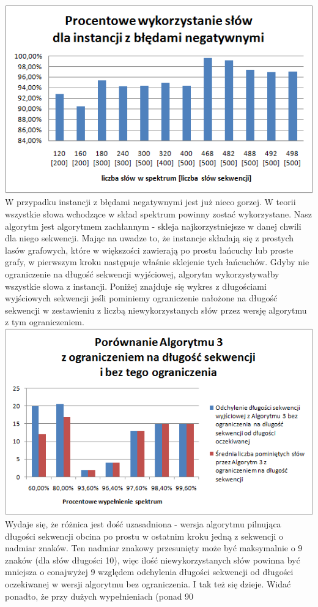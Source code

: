 \documentclass[a4paper]{article}
\begin{document}
\includegraphics{percentageUsedWords_general_negative.png}
W przypadku instancji z błędami negatywnymi jest już nieco gorzej. W teorii wszystkie słowa wchodzące w skład spektrum powinny zostać wykorzystane. Nasz algorytm jest algorytmem zachłannym - skleja najkorzystniejsze w danej chwili dla niego sekwencji. Mając na uwadze to, że instancje składają się z prostych lasów grafowych, które w większości zawierają po prostu łańcuchy lub proste grafy, w pierwszym kroku następuje właśnie sklejenie tych łańcuchów. Gdyby nie ograniczenie na długość sekwencji wyjściowej, algorytm wykorzystywałby wszystkie słowa z instancji. Poniżej znajduje się wykres z długościami wyjściowych sekwencji jeśli pominiemy ograniczenie nałożone na długość sekwencji w zestawieniu z liczbą niewykorzystanych słów przez wersję algorytmu z tym ograniczeniem.
\includegraphics{withoutNConstraint_general_negative.png}
Wydaje się, że różnica jest dość uzasadniona - wersja algorytmu pilnująca długości sekwencji obcina po prostu w ostatnim kroku jedną z sekwencji o nadmiar znaków. Ten nadmiar znakowy przesunięty może być maksymalnie o 9 znaków (dla słów długości 10), więc ilość niewykorzystanych słów powinna być mniejsza o conajwyżej 9 względem odchylenia długości sekwencji od długości oczekiwanej w wersji algorytmu bez ograniczenia. I tak też się dzieje. Widać ponadto, że przy dużych wypełnieniach (ponad 90%
\end{document}
